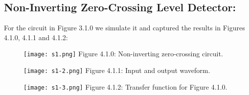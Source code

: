 \subsection{Non-Inverting Zero-Crossing Level Detector:}

For the circuit in Figure 3.1.0 we simulate it and captured the results in Figures 4.1.0, 4.1.1 and 4.1.2:

\begin{figure}[H]
\texttt{[image: s1.png]}
\centering \linebreak \linebreak Figure 4.1.0: Non-inverting zero-crossing circuit.
\end{figure} \hfill

\begin{multicols}{2}
\begin{figure}[H]
\texttt{[image: s1-2.png]}
\centering \linebreak \linebreak Figure 4.1.1: Input and output waveform.
\end{figure} \hfill

\begin{figure}[H]
\texttt{[image: s1-3.png]}
\centering \linebreak \linebreak Figure 4.1.2: Transfer function for Figure 4.1.0.
\end{figure} \hfill
\end{multicols} 

\pagebreak